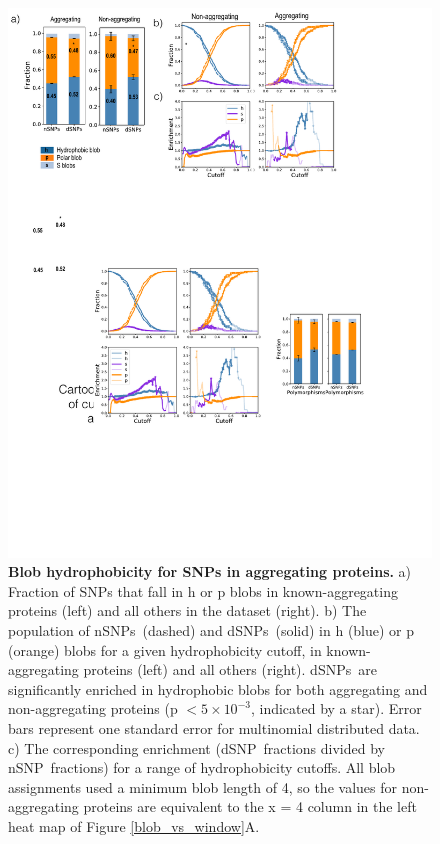 \documentclass[10pt,letterpaper]{article}
\newcommand{\dSNPs}{dSNPs~}
\newcommand{\nSNPs}{nSNPs~}
\newcommand{\dSNP}{dSNP~}
\newcommand{\nSNP}{nSNP~}
\begin{document}
\begin{figure}[!ht]
\includegraphics[scale=0.1,width=\textwidth,trim={0 0cm 0 0cm},clip]{./figures/fig4.pdf}
\caption{{\bf Blob hydrophobicity for SNPs in aggregating proteins.} a) Fraction of SNPs that fall in h or p blobs in known-aggregating proteins (left) and all others in the dataset (right). b) The population of \nSNPs (dashed) and \dSNPs (solid) in h (blue) or p (orange) blobs for a given hydrophobicity cutoff, in known-aggregating proteins (left) and all others (right).  \dSNPs are significantly enriched in hydrophobic blobs for both aggregating and non-aggregating proteins (p $< 5\times10^{-3}$, indicated by a star). Error bars represent one standard error for multinomial distributed data. c) The corresponding enrichment (\dSNP fractions divided by  \nSNP fractions) for a range of hydrophobicity cutoffs.   All blob assignments used a minimum blob length of 4, so the values for non-aggregating proteins are equivalent to the x = 4 column in the left heat map of Figure \ref{blob_vs_window}A.  
 }
\label{agg_enrich} 
\end{figure}
\end{document}
